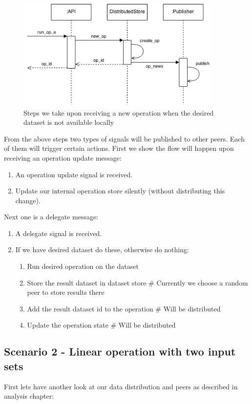 \begin{figure}[h]
  \centering
  \includegraphics[width=4in]{poster/figures/kseq.png}
  \caption[Sequence diagram of receiving a new operation]
   {Steps we take upon receiving a new operation when the desired dataset is not available locally}
\end{figure}

From the above steps two types of signals will be published to other peers. 
Each of them will trigger certain actions. 
First we show the flow will happen upon receiving an operation update message:
\begin{enumerate}
\item An operation update signal is received.
\item Update our internal operation store silently (without distributing this change).
\end{enumerate}

Next one is a delegate message:
\begin{enumerate}
\item A delegate signal is received.
\item If we have desired dataset do these, otherwise do nothing:
  \begin{enumerate}
  \item Run desired operation on the dataset
  \item Store the result dataset in dataset store \# Currently we choose a random peer to store results there
  \item Add the result dataset id to the operation \# Will be distributed
  \item Update the operation state \# Will be distributed
  \end{enumerate}
\end{enumerate}

\subsection{Scenario 2 - Linear operation with two input sets}
First lets have another look at our data distribution and peers as described in analysis chapter:

